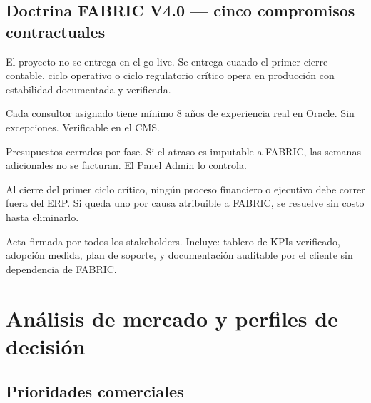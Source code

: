 \documentclass[11pt, a4paper]{article}
\begin{document}
\subsection{Doctrina FABRIC V4.0 — cinco compromisos contractuales}

\begin{doctrinabox}
El proyecto no se entrega en el go-live. Se entrega cuando el primer cierre contable,
ciclo operativo o ciclo regulatorio crítico opera en producción con estabilidad
documentada y verificada.
\end{doctrinabox}

\begin{doctrinabox}
Cada consultor asignado tiene mínimo 8 años de experiencia real en Oracle.
Sin excepciones. Verificable en el CMS.
\end{doctrinabox}

\begin{doctrinabox}
Presupuestos cerrados por fase. Si el atraso es imputable a FABRIC, las semanas
adicionales no se facturan. El Panel Admin lo controla.
\end{doctrinabox}

\begin{doctrinabox}
Al cierre del primer ciclo crítico, ningún proceso financiero o ejecutivo debe
correr fuera del ERP. Si queda uno por causa atribuible a FABRIC, se resuelve
sin costo hasta eliminarlo.
\end{doctrinabox}

\begin{doctrinabox}
Acta firmada por todos los stakeholders. Incluye: tablero de KPIs verificado,
adopción medida, plan de soporte, y documentación auditable por el cliente
sin dependencia de FABRIC.
\end{doctrinabox}

\newpage


\section{Análisis de mercado y perfiles de decisión}

\subsection{Prioridades comerciales}
\end{document}

